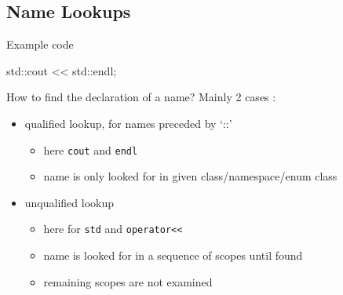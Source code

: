 \subsection[ADL]{Name Lookups}

\begin{frame}[fragile]
  \begin{exampleblock}{Example code}
    \begin{cppcode}
      std::cout << std::endl;
    \end{cppcode}
  \end{exampleblock}
  \begin{block}{How to find the declaration of a name?}
    Mainly 2 cases :
    \begin{itemize}
    \item qualified lookup, for names preceded by `::'
      \begin{itemize}
      \item here \texttt{cout} and \texttt{endl}
      \item name is only looked for in given class/namespace/enum class
      \end{itemize}
    \item unqualified lookup
      \begin{itemize}
      \item here for \texttt{std} and \texttt{operator<<}
      \item name is looked for in a sequence of scopes until found
      \item remaining scopes are not examined
      \end{itemize}
    \end{itemize}
  \end{block}
\end{frame}

